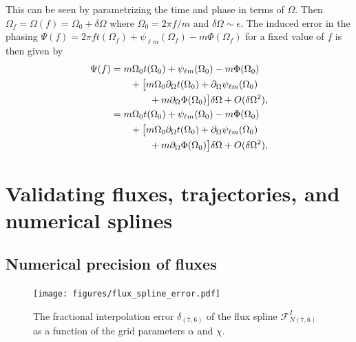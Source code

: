 \documentclass[%
 reprint,
 nofootinbib,
 amsmath,amssymb,
 aps,
 prd,
]{revtex4-2}
\begin{document}
This can be seen by parametrizing the time and phase in terms of $\Omega$. Then $\Omega_f = \Omega(f) = \Omega_0 + \delta\Omega$ where $\Omega_0 = 2\pi f/m$ and $\delta\Omega \sim \epsilon$. The induced error in the phasing $\Psi(f) = 2\pi f t(\Omega_f) + \psi_{\ell m}(\Omega_f) - m\Phi(\Omega_f)$ for a fixed value of $f$ is then given by
\begin{align}
    \Psi(f) &=
    m\Omega_0 t(\Omega_0) + \psi_{\ell m}(\Omega_0) - m\Phi(\Omega_0) 
    \\ \notag
    & \qquad + \big[m\Omega_0 \partial_\Omega t(\Omega_0) + \partial_\Omega\psi_{\ell m}(\Omega_0) 
    \\ \notag
    & \qquad \qquad + m\partial_\Omega\Phi(\Omega_0)\big]\delta \Omega + O(\delta\Omega^2),
    \\
    &=
    m\Omega_0 t(\Omega_0) + \psi_{\ell m}(\Omega_0) - m\Phi(\Omega_0) 
    \\ \notag
    & \qquad + \big[m\Omega_0 \partial_\Omega t(\Omega_0) + \partial_\Omega\psi_{\ell m}(\Omega_0) 
    \\ \notag
    & \qquad \qquad + m\partial_\Omega\Phi(\Omega_0)\big]\delta \Omega + O(\delta\Omega^2),
\end{align}

\section{Validating fluxes, trajectories, and numerical splines}
\label{app:tests}

\subsection{Numerical precision of fluxes}
\label{app:fluxtests}

\begin{figure}[h!]
    \centering
    \texttt{[image: figures/flux\_spline\_error.pdf]}
    \caption{The fractional interpolation error $\delta_{(7,6)}$ of the flux spline $\mathcal{F}_{N(7,6)}^I$ as a function of the grid parameters $\alpha$ and $\chi$.}
    \label{fig:fluxSplineError}
\end{figure}
\end{document}
